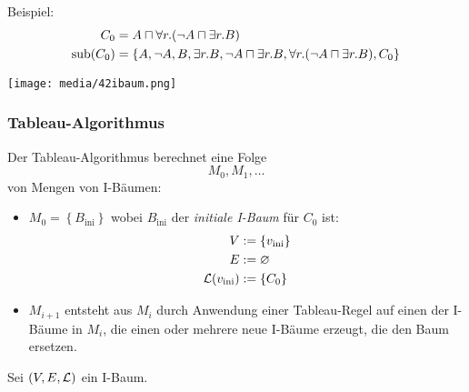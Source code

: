 \begin{tafel}
    Beispiel:
    \begin{align*}
        C_0 &= A \sqcap \forall r.(\neg A \sqcap \exists r.B)\\
        \operatorname{sub}(C_0) &= \{A, \neg A, B, \exists r.B, \neg A \sqcap \exists r.B, \forall r.(\neg A \sqcap \exists r.B), C_0\}
    \end{align*}

    \texttt{[image: media/42ibaum.png]}
\end{tafel}

\subsubsection{Tableau-Algorithmus}\label{tableau-algorithmus}

Der Tableau-Algorithmus berechnet eine Folge $$M_0,M_1,\ldots$$ von Mengen von I-Bäumen:
\begin{itemize}
    \item $M_0 = \left\{ B_{\text{ini}} \right\}$ wobei $B_{\text{ini}}$ der \emph{initiale I-Baum} für $C_0$ ist:
        \begin{align*}
            V &:= \left\{ v_{\text{ini}} \right\}\\
            E &:= \emptyset\\
            \ML\left(v_{\text{ini}}\right) &:= \left\{ C_0 \right\}
        \end{align*}
    \item $M_{i + 1}$ entsteht aus $M_i$ durch Anwendung einer Tableau-Regel
        auf einen der I-Bäume in $M_i$, die einen oder mehrere neue I-Bäume
        erzeugt, die den Baum ersetzen.
\end{itemize}

Sei $\left( V,E,\ML \right)$ ein I-Baum.

